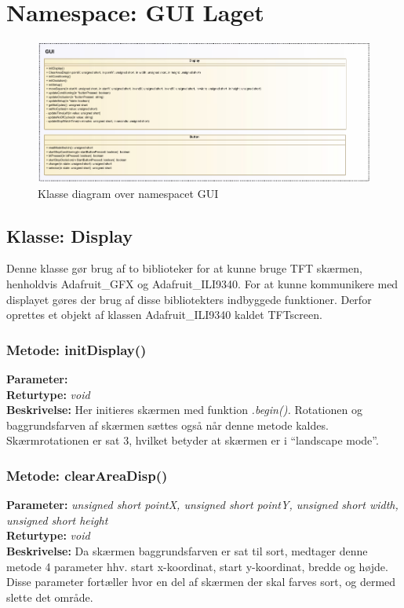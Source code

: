 \section{Namespace: GUI Laget}

\begin{figure}[H]
	\includegraphics[width=\textwidth]{klassediagram_GUI-crop.pdf}
	\caption{Klasse diagram over namespacet GUI}\label{fig:classDiagramGUI}
\end{figure}

\subsection{Klasse: Display}
Denne klasse gør brug af to biblioteker for at kunne bruge TFT skærmen, henholdvis Adafruit\_GFX og Adafruit\_ILI9340. For at kunne kommunikere med displayet gøres der brug af disse bibliotekters indbyggede funktioner. Derfor oprettes et objekt af klassen Adafruit\_ILI9340 kaldet TFTscreen.

\subsubsection{Metode: initDisplay()}
\textbf{Parameter: } 
\\ \textbf{Returtype: } \textit{void}
\\ \textbf{Beskrivelse: } Her initieres skærmen med funktion \textit{.begin().} Rotationen og baggrundsfarven af skærmen sættes også når denne metode kaldes. Skærmrotationen er sat 3, hvilket betyder at skærmen er i “landscape mode”. 

\subsubsection{Metode: clearAreaDisp()}
\textbf{Parameter: } \textit{unsigned short pointX, unsigned short pointY, unsigned short width, unsigned short height}
\\ \textbf{Returtype: } \textit{void}
\\ \textbf{Beskrivelse: } Da skærmen baggrundsfarven er sat til sort, medtager denne metode 4 parameter hhv. start x-koordinat, start y-koordinat, bredde og højde. Disse parameter fortæller hvor en del af skærmen der skal farves sort, og dermed slette det område.

